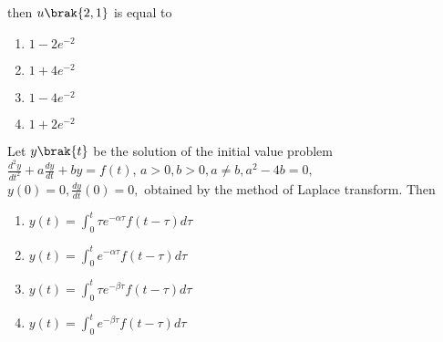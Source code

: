 then $u\brak{2, 1}$ is equal to
    \begin{enumerate}
        \item $1 - 2e^{-2}$
        \item $1 + 4e^{-2}$
        \item $1 - 4e^{-2}$
        \item $1 + 2e^{-2}$
    \end{enumerate} 
    \item Let $y\brak{t}$ be the solution of the initial value problem \\$\displaystyle \frac{d^{2}y}{dt^{2}} + a\frac{dy}{dt} + by = f(t)$, $a > 0, b > 0, a \neq b,  a^{2} - 4b = 0,$ \\ $y(0) = 0, \displaystyle \frac{dy}{dt}(0) = 0,$ obtained by the method of Laplace transform. Then 
    \begin{enumerate}
        \item $ y(t) = \int_{0}^{t} \tau e^{-\alpha \tau} f(t - \tau) d\tau $
        \item $ y(t) = \int_{0}^{t} e^{-\alpha \tau} f(t - \tau) d\tau $
        \item $ y(t) = \int_{0}^{t} \tau e^{-\beta \tau} f(t - \tau) d\tau $
        \item $ y(t) = \int_{0}^{t} e^{-\beta \tau} f(t - \tau) d\tau $
    \end{enumerate}

  



